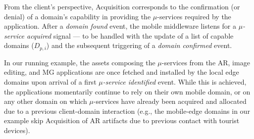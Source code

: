 
%
%	
%	
%	


From the client's perspective, Acquisition corresponds to the confirmation (or denial) of a domain's capability in providing the $\mu$-services required by the application. After a \textit{domain found} event, the mobile middleware listens for a \textit{$\mu$-service acquired} signal --- to be handled with the update of a list of capable domains ($D_{p,i}$) and the subsequent triggering of a \textit{domain confirmed} event.

In our running example, the assets composing the $\mu$-services from the AR, image editing, and MG applications are once fetched and installed by the local edge domains upon arrival of a first \textit{$\mu$-service identified} event. While this is achieved, the applications momentarily continue to rely on their own mobile domain, or on any other domain on which $\mu$-services have already been acquired and allocated due to a previous client-domain interaction (e.g., the mobile-edge domains in our example skip Acquisition of AR artifacts due to previous contact with tourist devices).

